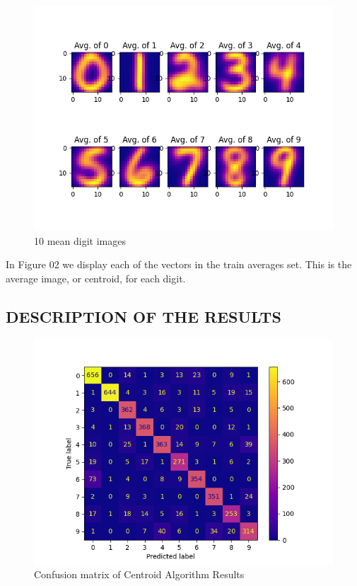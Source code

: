 \documentclass[dvipsnames,12pt]{article} %
\begin{document}
                  \begin{figure}[h!]
	\centering
	\includegraphics[width = \textwidth]{FPPFigure_2.png}
	\caption{10 mean digit images}
	\label{fig: FIG 02}
\end{figure}


          \vspace{06pt}
          
In Figure 02 we display each of the vectors in the train averages set. This is the average image, or centroid, for each digit.

          \newpage

      \subsection{DESCRIPTION OF THE RESULTS}
       \label{SUBSECT 3.2:CENTROID RESULTS}


\vspace{06pt}
   
                  \begin{figure}[h!]
	\centering
	\includegraphics[width = \textwidth]{FPPtest_confusion.png}
	\caption{Confusion matrix of Centroid Algorithm Results}
	\label{fig: FIG 03}
\end{figure}
\end{document}
